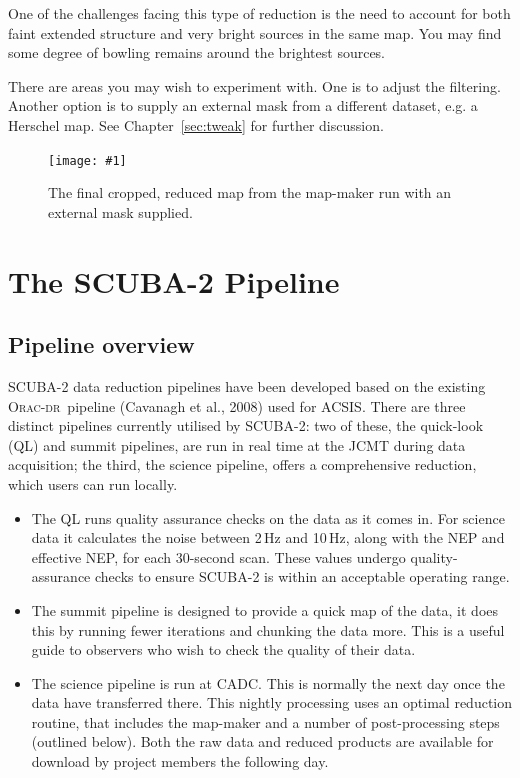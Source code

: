 \documentclass[twoside,11pt]{article}
\newcommand{\htmladdnormallink}[2]{#1}
\newcommand{\htmladdimg}[1]{}
\newcommand{\htmlref}[2]{#1}
\newcommand{\latexhtml}[2]{#1}
\newcommand{\xlabel}[1]{}
\renewcommand{\_}{\texttt{\symbol{95}}}
\newcommand{\oracdr}{\htmladdnormallink{\textsc{Orac-dr}}{http://www.oracdr.org/oracdr}}
\newcommand{\myfig}[6]{
  \begin{figure}#2
    \centering\texttt{[image: \#1]}
    \typeout{#1 inserted on page \arabic{page}}
    \caption[#5]{\label{#4}\small #6}
  \end{figure}
}
\newcommand{\myfig}[6]{
    \label{#4} \htmladdimg{#1.png}\\
    \\
    Figure: #6\\
  }
\newcommand{\cref}[3]{\latexhtml{#1~\ref{#2}}{\htmlref{#3}{#2}}}
\begin{document}
One of the challenges facing this type of reduction is the need to
account for both faint extended structure and very bright sources in
the same map. You may find some degree of bowling remains around the
brightest sources.

There are areas you may wish to experiment with. One is to adjust the
filtering. Another option is to supply an external mask from
a different dataset, e.g. a
\htmladdnormallink{Herschel}{http://herschel.esac.esa.int/} map.
See \cref{Chapter}{sec:tweak}{Tailoring Your Reduction} for further
discussion.

\myfig{sc21_gal12_crop}{[b!]}{width=0.65\hsize}{fig:crop_map}{
  Galactic example: cropped final map}{
  The final cropped, reduced map from the map-maker run with
  an external mask supplied.
}


\clearpage
\section{\xlabel{pipeline}The SCUBA-2 Pipeline}
\label{sec:pipe}

\subsection{\xlabel{pl_overview}Pipeline overview}

SCUBA-2 data reduction pipelines have been developed based on the
existing \oracdr\ pipeline (Cavanagh et al., 2008\cite{oracdr}) used
for ACSIS. There are three distinct pipelines currently utilised by
SCUBA-2: two of these, the quick-look (QL) and summit pipelines, are
run in real time at the JCMT during data acquisition; the third, the science
pipeline, offers a comprehensive reduction, which users can run locally.

\begin{itemize}
\item The QL runs quality assurance checks on the data as it comes in.
For science data it calculates the noise between 2\,Hz and 10\,Hz,
along with the NEP and effective NEP, for each 30-second scan. These
values undergo quality-assurance checks to ensure SCUBA-2 is within
an acceptable operating range.
\item The summit pipeline is designed to provide a quick map of the
data, it does this by running fewer iterations and chunking the data
more. This is a useful guide to observers who wish to check the
quality of their data.
\item The science pipeline is run at CADC. This is normally the next
day once the data have transferred there.  This nightly processing
uses an optimal reduction routine, that includes the map-maker and a
number of post-processing steps (outlined below). Both the raw data
and reduced products are available for download by project members the
following day.
\end{itemize}
\end{document}
